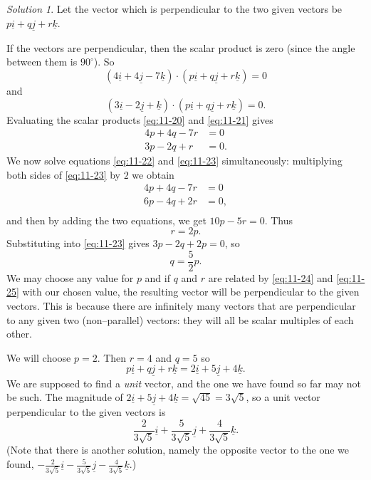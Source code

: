 \documentclass[
  11pt,
  oneside]{book}
\theoremstyle{definition}
\theoremstyle{definition}
\theoremstyle{definition}
\theoremstyle{definition}
\theoremstyle{remark}
\newtheorem*{solution}{Solution}
\begin{document}
\begin{solution}
Let the vector which is perpendicular to the two given vectors be \(p\underline i + q\underline j + r\underline k\).

If the vectors are perpendicular, then the scalar product is zero (since the angle between them is \(90^\circ\)). So
\begin{equation}
(4\underline i + 4\underline j - 7\underline k) \cdot (p\underline i + q\underline j + r\underline k) = 0
\label{eq:11-20}
\end{equation}
and
\begin{equation}
(3\underline i - 2\underline j + \underline k) \cdot (p\underline i + q\underline j + r\underline k) = 0.
\label{eq:11-21}
\end{equation}
Evaluating the scalar products \eqref{eq:11-20} and \eqref{eq:11-21} gives
\begin{align}
4p + 4q -7r& = 0
\label{eq:11-22}\\
3p - 2q + r& = 0.
\label{eq:11-23}
\end{align}
We now solve equations \eqref{eq:11-22} and \eqref{eq:11-23} simultaneously: multiplying both sides of \eqref{eq:11-23} by \(2\) we obtain
\begin{align*}
4p + 4q - 7r& = 0\\
6p - 4q + 2r& = 0,\\
\end{align*}
and then by adding the two equations, we get \(10p - 5r = 0\). Thus
\begin{equation}
r = 2p.
\label{eq:11-24}
\end{equation}
Substituting into \eqref{eq:11-23} gives \(3p - 2q + 2p = 0\), so
\begin{equation}
q = \frac52p.
\label{eq:11-25}
\end{equation}
We may choose any value for \(p\) and if \(q\) and \(r\) are related by \eqref{eq:11-24} and \eqref{eq:11-25} with our chosen value, the resulting vector will be perpendicular to the given vectors. This is because there are infinitely many vectors that are perpendicular to any given two (non--parallel) vectors: they will all be scalar multiples of each other.

We will choose \(p = 2\). Then \(r= 4\) and \(q = 5\) so
\[
p\underline i + q\underline j + r\underline k = 2\underline i + 5\underline j + 4\underline k.
\]
We are supposed to find a \emph{unit} vector, and the one we have found so far may not be such. The magnitude of \(2\underline i + 5\underline j + 4\underline k = \sqrt{45} = 3\sqrt{5}\), so a unit vector perpendicular to the given vectors is
\[
\frac{2}{3\sqrt{5}}\underline i+\frac{5}{3\sqrt{5}}\underline j+\frac{4}{3\sqrt{5}}\underline k.
\]
(Note that there is another solution, namely the opposite vector to the one we found,
\(-\frac{2}{3\sqrt{5}}\underline i-\frac{5}{3\sqrt{5}}\underline j-\frac{4}{3\sqrt{5}}\underline k\).)
\end{solution}
\end{document}
